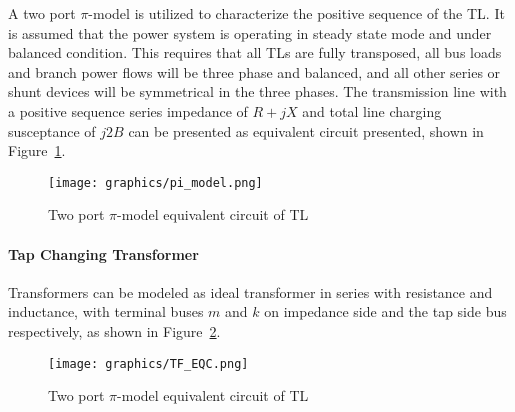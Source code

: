 A two port $\pi$-model is utilized to characterize the positive sequence of the TL. It is assumed that the power system is operating in steady state mode and under balanced condition. This requires that all TLs are fully transposed, all bus loads and branch power flows will be three phase and balanced,  and all other series or shunt devices will be symmetrical in the three phases. The transmission line with a positive sequence series impedance of \(R + jX\) and total line charging susceptance of $j2B$ can be presented as equivalent circuit presented, shown in Figure~\cref{fig:pi_model}.

\begin{figure}[htbp]
    \centering
    \texttt{[image: graphics/pi\_model.png]}
    \caption{Two port $\pi$-model equivalent circuit of TL}
    \label{fig:pi_model}
\end{figure}

\paragraph{Tap Changing Transformer}

Transformers can be modeled as ideal transformer in series with resistance and inductance, with terminal buses $m$ and $k$ on impedance side and the tap side bus respectively, as shown in Figure~\cref{fig:tf_eqc}.

\begin{figure}[htbp]
    \centering
    \texttt{[image: graphics/TF\_EQC.png]}
    \caption{Two port $\pi$-model equivalent circuit of TL}
    \label{fig:tf_eqc}
\end{figure}

